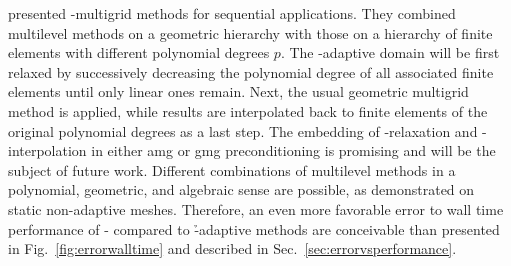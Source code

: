 \textcite{mitchell2010} presented \hp-multigrid methods for sequential applications. They combined multilevel methods on a geometric hierarchy with those on a hierarchy of finite elements with different polynomial degrees $p$. The \hp-adaptive domain will be first relaxed by successively decreasing the polynomial degree of all associated finite elements until only linear ones remain. Next, the usual geometric multigrid method is applied, while results are interpolated back to finite elements of the original polynomial degrees as a last step. The embedding of \p-relaxation and \p-interpolation in either \gls{amg} or \gls{gmg} preconditioning is promising and will be the subject of future work. Different combinations of multilevel methods in a polynomial, geometric, and algebraic sense are possible, as \textcite{fehn2019} demonstrated on static non-adaptive meshes. %
Therefore, an even more favorable error to wall time performance of \hp- compared to \h-adaptive methods are conceivable than presented in Fig.~\ref{fig:errorwalltime} and described in Sec.~\ref{sec:errorvsperformance}.

